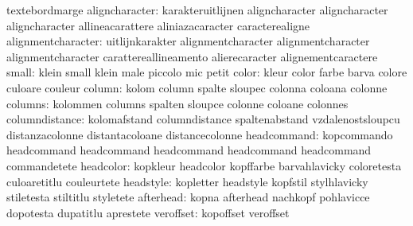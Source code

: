                            textebordmarge
           aligncharacter: karakteruitlijnen         aligncharacter
                           aligncharacter            aligncharacter
                           allineacarattere          aliniazacaracter
                           caracterealigne
       alignmentcharacter: uitlijnkarakter           alignmentcharacter
                           alignmentcharacter        alignmentcharacter
                           carattereallineamento     alierecaracter
                           alignementcaractere
                    small: klein                     small
                           klein                     male
                           piccolo                   mic
                           petit
                    color: kleur                     color
                           farbe                     barva
                           colore                    culoare
                           couleur
                   column: kolom                     column
                           spalte                    sloupec
                           colonna                   coloana
                           colonne
                  columns: kolommen                  columns
                           spalten                   sloupce
                           colonne                   coloane
                           colonnes
           columndistance: kolomafstand              columndistance
                           spaltenabstand            vzdalenostsloupcu
                           distanzacolonne           distantacoloane
                           distancecolonne
              headcommand: kopcommando               headcommand
                           headcommand               headcommand
                           headcommand               headcommand
                           commandetete
                headcolor: kopkleur                  headcolor
                           kopffarbe                 barvahlavicky
                           coloretesta               culoaretitlu
                           couleurtete
                headstyle: kopletter                 headstyle
                           kopfstil                  stylhlavicky
                           stiletesta                stiltitlu
                           styletete
                afterhead: kopna                     afterhead
                           nachkopf                  pohlavicce
                           dopotesta                 dupatitlu
                           aprestete
                veroffset: kopoffset                 veroffset
